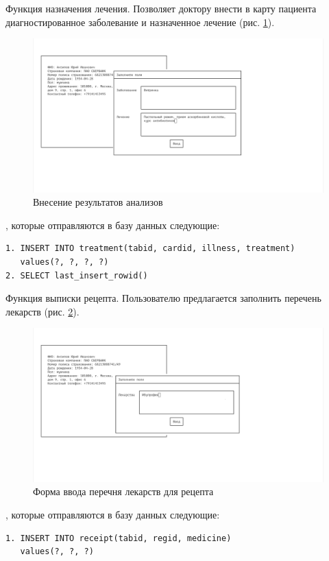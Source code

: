 \documentclass[14pt,a4paper,russian]{extreport}
\begin{document}
Функция назначения лечения. Позволяет доктору внести в карту пациента диагностированное заболевание и назначенное лечение (рис. \ref{fig:treatment-create}).\par
\begin{figure}[h!]
        \includegraphics[width=\textwidth]{prog_int/treatment}
        \caption{Внесение результатов анализов}
        \label{fig:treatment-create}
\end{figure}
, которые отправляются в базу данных следующие: 
\begin{lstlisting}[style=csql] 
1. INSERT INTO treatment(tabid, cardid, illness, treatment)
   values(?, ?, ?, ?)
2. SELECT last_insert_rowid()
\end{lstlisting}

Функция выписки рецепта. Пользователю предлагается заполнить перечень лекарств (рис. \ref{fig:receipt-issue}).\par
\begin{figure}[h!]
        \includegraphics[width=\textwidth]{prog_int/receipt-issue}
        \caption{Форма ввода перечня лекарств для рецепта}
        \label{fig:receipt-issue}
\end{figure}
, которые отправляются в базу данных следующие: 
\begin{lstlisting}[style=csql] 
1. INSERT INTO receipt(tabid, regid, medicine)
   values(?, ?, ?)
\end{lstlisting}
\end{document}
